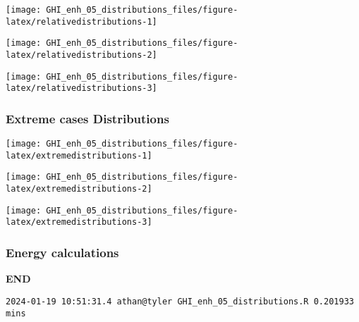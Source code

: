 \documentclass[
  10pt,
  a4paper,oneside]{article}
\begin{document}
\begin{center}\texttt{[image: GHI\_enh\_05\_distributions\_files/figure-latex/relativedistributions-1]} \end{center}

\begin{center}\texttt{[image: GHI\_enh\_05\_distributions\_files/figure-latex/relativedistributions-2]} \end{center}

\begin{center}\texttt{[image: GHI\_enh\_05\_distributions\_files/figure-latex/relativedistributions-3]} \end{center}

\FloatBarrier

\hypertarget{extreme-cases-distributions}{%
\subsubsection{Extreme cases Distributions}\label{extreme-cases-distributions}}

\begin{center}\texttt{[image: GHI\_enh\_05\_distributions\_files/figure-latex/extremedistributions-1]} \end{center}

\begin{center}\texttt{[image: GHI\_enh\_05\_distributions\_files/figure-latex/extremedistributions-2]} \end{center}

\begin{center}\texttt{[image: GHI\_enh\_05\_distributions\_files/figure-latex/extremedistributions-3]} \end{center}

\FloatBarrier

\hypertarget{energy-calculations}{%
\subsubsection{Energy calculations}\label{energy-calculations}}

\textbf{END}

\begin{verbatim}
2024-01-19 10:51:31.4 athan@tyler GHI_enh_05_distributions.R 0.201933 mins
\end{verbatim}
\end{document}

